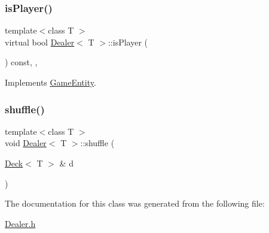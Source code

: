 \mbox{\label{class_dealer_aa59b2493c7935d90eeb046433af00fa2}} 
\subsubsection{\texorpdfstring{is\+Player()}{isPlayer()}}
{\footnotesize\ttfamily template$<$class T $>$ \\
virtual bool \mbox{\hyperlink{class_dealer}{Dealer}}$<$ T $>$\+::is\+Player (\begin{DoxyParamCaption}{ }\end{DoxyParamCaption}) const\hspace{0.3cm}{\ttfamily [inline]}, {\ttfamily [override]}, {\ttfamily [virtual]}}



Implements \mbox{\hyperlink{class_game_entity_a6528d6c01269ce943d690ca607e4cff8}{Game\+Entity}}.

\mbox{\label{class_dealer_ad15430c5e44be12ed63fa5a8bccf5205}} 
\subsubsection{\texorpdfstring{shuffle()}{shuffle()}}
{\footnotesize\ttfamily template$<$class T $>$ \\
void \mbox{\hyperlink{class_dealer}{Dealer}}$<$ T $>$\+::shuffle (\begin{DoxyParamCaption}\item[{\mbox{\hyperlink{class_deck}{Deck}}$<$ T $>$ \&}]{d }\end{DoxyParamCaption})}



The documentation for this class was generated from the following file\+:\begin{DoxyCompactItemize}
\item 
\mbox{\hyperlink{_dealer_8h}{Dealer.\+h}}\end{DoxyCompactItemize}
